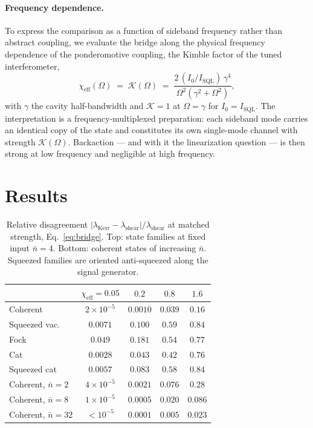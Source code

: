 \documentclass[11pt]{article}
\newcommand{\nbar}{\bar{n}}
\newcommand{\chieff}{\chi_{\mathrm{eff}}}
\begin{document}
\paragraph{Frequency dependence.} To express the comparison as a function
of sideband frequency rather than abstract coupling, we evaluate the
bridge along the physical frequency dependence of the ponderomotive
coupling, the Kimble factor of the tuned interferometer,
\begin{equation}
  \chieff(\Omega) \;=\; \mathcal{K}(\Omega)
  \;=\; \frac{2\,(I_0/I_{\mathrm{SQL}})\,\gamma^{4}}
             {\Omega^{2}\left(\gamma^{2} + \Omega^{2}\right)},
  \label{eq:kimble}
\end{equation}
with $\gamma$ the cavity half-bandwidth and $\mathcal{K} = 1$ at
$\Omega = \gamma$ for $I_0 = I_{\mathrm{SQL}}$. The interpretation is a
frequency-multiplexed preparation: each sideband mode carries an identical
copy of the state and constitutes its own single-mode channel with
strength $\mathcal{K}(\Omega)$. Backaction --- and with it the
linearization question --- is then strong at low frequency and negligible
at high frequency.

\section{Results}

\begin{table}[b]
\centering
\caption{Relative disagreement
$|\lambda_{\mathrm{Kerr}} - \lambda_{\mathrm{shear}}| /
\lambda_{\mathrm{shear}}$ at matched strength, Eq.~\eqref{eq:bridge}.
Top: state families at fixed input $\nbar = 4$. Bottom: coherent states of
increasing $\nbar$. Squeezed families are oriented anti-squeezed along the
signal generator.}
\label{tab:errors}
\vspace{2pt}
\begin{tabular}{lcccc}
\toprule
 & $\chieff = 0.05$ & $0.2$ & $0.8$ & $1.6$ \\
\midrule
Coherent        & $2\times10^{-5}$ & $0.0010$ & $0.039$ & $0.16$ \\
Squeezed vac.   & $0.0071$         & $0.100$  & $0.59$  & $0.84$ \\
Fock            & $0.049$          & $0.181$  & $0.54$  & $0.77$ \\
Cat             & $0.0028$         & $0.043$  & $0.42$  & $0.76$ \\
Squeezed cat    & $0.0057$         & $0.083$  & $0.58$  & $0.84$ \\
\midrule
Coherent, $\nbar = 2$  & $4\times10^{-5}$ & $0.0021$ & $0.076$ & $0.28$ \\
Coherent, $\nbar = 8$  & $1\times10^{-5}$ & $0.0005$ & $0.020$ & $0.086$ \\
Coherent, $\nbar = 32$ & $<10^{-5}$       & $0.0001$ & $0.005$ & $0.023$ \\
\bottomrule
\end{tabular}
\end{table}
\end{document}
